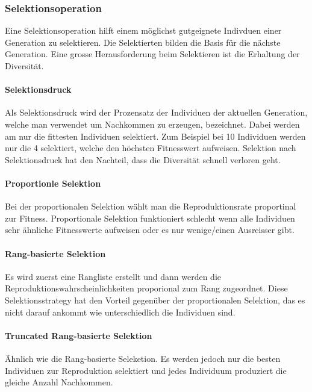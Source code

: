     \subsubsection{Selektionsoperation}
      Eine Selektionsoperation hilft einem möglichst gutgeignete Indivduen einer Generation zu selektieren.
      Die Selektierten bilden die Basis für die nächste Generation. Eine grosse Herausforderung beim Selektieren ist die Erhaltung der Diversität.

      \paragraph{Selektionsdruck}
        Als Selektionsdruck wird der Prozensatz der Individuen der aktuellen Generation, welche man verwendet um Nachkommen zu erzeugen, bezeichnet.
        Dabei werden am nur die fittesten Individuen selektiert. Zum Beispiel bei 10 Individuen werden nur die 4 selektiert, welche den höchsten Fitnesswert aufweisen.
        Selektion nach Selektionsdruck hat den Nachteil, dass die Diversität schnell verloren geht.

      \paragraph{Proportionle Selektion}
        Bei der proportionalen Selektion wählt man die Reproduktionsrate proportinal zur Fitness.
        Proportionale Selektion funktioniert schlecht wenn alle Individuen sehr ähnliche Fitnesswerte aufweisen oder es nur wenige/einen Ausreisser gibt.

      \paragraph{Rang-basierte Selektion}
        Es wird zuerst eine Rangliste erstellt und dann werden die Reproduktionswahrscheinlichkeiten proporional zum Rang zugeordnet.
        Diese Selektionsstrategy hat den Vorteil gegenüber der proportionalen Selektion, das es nicht darauf ankommt wie unterschiedlich die Individuen sind.

      \paragraph{Truncated Rang-basierte Selektion}
        Ähnlich wie die Rang-basierte Seleketion. Es werden jedoch nur die besten Individuen zur Reproduktion selektiert und
        jedes Individuum produziert die gleiche Anzahl Nachkommen.

